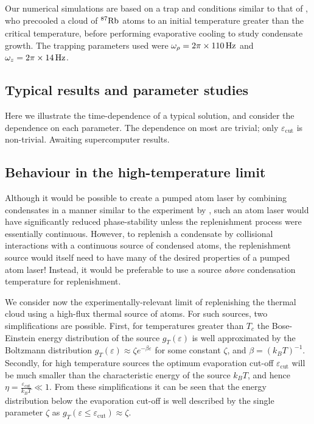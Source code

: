 Our numerical simulations are based on a trap and conditions similar to that of \citep{Kohl:2002}, who precooled a cloud of $\nucl{87}{}{Rb}$ atoms to an initial temperature greater than the critical temperature, before performing evaporative cooling to study condensate growth. The trapping parameters used were $\omega_\rho = \unit[2 \pi \times 110]{Hz}$ and $\omega_z = \unit[2\pi \times 14]{Hz}$.

\subsection{Typical results and parameter studies}
\label{KineticTheory:ParameterStudies}

Here we illustrate the time-dependence of a typical solution, and consider the dependence on each parameter. The dependence on most are trivial; only $\varepsilon_\text{cut}$ is non-trivial. Awaiting supercomputer results.



\subsection{Behaviour in the high-temperature limit}
Although it would be possible to create a pumped atom laser by combining condensates in a manner similar to the experiment by \citet{Chikkatur:2002qa}, such an atom laser would have significantly reduced phase-stability unless the replenishment process were essentially continuous. However, to replenish a condensate by collisional interactions with a continuous source of condensed atoms, the replenishment source would itself need to have many of the desired properties of a pumped atom laser! Instead, it would be preferable to use a source \emph{above} condensation temperature for replenishment.

We consider now the experimentally-relevant limit of replenishing the thermal cloud using a high-flux thermal source of atoms. For such sources, two simplifications are possible. First, for temperatures greater than $T_c$ the Bose-Einstein energy distribution of the source $g_T(\varepsilon)$ is well approximated by the Boltzmann distribution $g_T(\varepsilon) \approx \zeta e^{-\beta \varepsilon}$ for some constant $\zeta$, and $\beta = \left(k_B T\right)^{-1}$. Secondly, for high temperature sources the optimum evaporation cut-off $\varepsilon_\text{cut}$ will be much smaller than the characteristic energy of the source $k_B T$, and hence $\displaystyle \eta = \frac{\varepsilon_\text{cut}}{k_B T} \ll 1$.  From these simplifications it can be seen that the energy distribution below the evaporation cut-off is well described by the single parameter $\zeta$ as $g_T(\varepsilon \leq \varepsilon_\text{cut}) \approx \zeta$.


